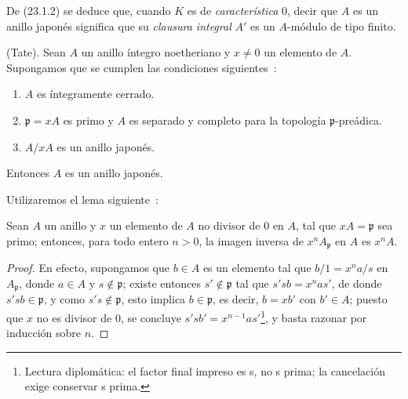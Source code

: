 De (23.1.2) se deduce que, cuando $K$ es de \emph{característica} $0$, decir que
$A$ es un anillo japonés significa que su \emph{clausura integral} $A'$ es
un $A$-módulo de tipo finito.

\begin{theorem}[23.1.3]
\label{0.23.1.3-fr}
\textnormal{(Tate).} Sean $A$ un anillo íntegro noetheriano y $x\neq0$ un
elemento de $A$. Supongamos que se cumplen las condiciones siguientes~:
\begin{enumerate}
  \item[\textup{(i)}] $A$ es íntegramente cerrado.
  \item[\textup{(ii)}] $\mathfrak p=xA$ es primo y $A$ es separado y completo para
  la topología $\mathfrak p$-preádica.
  \item[\textup{(iii)}] $A/xA$ es un anillo japonés.
\end{enumerate}
Entonces $A$ es un anillo japonés.
\end{theorem}

Utilizaremos el lema siguiente~:

\begin{lemma}[23.1.3.1]
\label{0.23.1.3.1-fr}
Sean $A$ un anillo y $x$ un elemento de $A$ no divisor de $0$ en $A$, tal
que $xA=\mathfrak p$ sea primo; entonces, para todo entero $n>0$, la imagen
inversa de $x^nA_{\mathfrak p}$ en $A$ es $x^nA$.
\end{lemma}

\begin{proof}
En efecto, supongamos que $b\in A$ es un elemento tal que
$b/1=x^na/s$ en $A_{\mathfrak p}$, donde $a\in A$ y
$s\notin\mathfrak p$; existe entonces $s'\notin\mathfrak p$ tal que
$s'sb=x^nas'$, de donde $s'sb\in\mathfrak p$, y como
$s's\notin\mathfrak p$, esto implica $b\in\mathfrak p$, es decir,
$b=xb'$ con $b'\in A$; puesto que $x$ no es divisor de $0$, se concluye
$s'sb'=x^{n-1}as'$\footnote{Lectura diplomática: el factor final impreso es s, no s prima; la cancelación exige conservar s prima.}, y basta razonar por inducción sobre $n$.
\end{proof}

